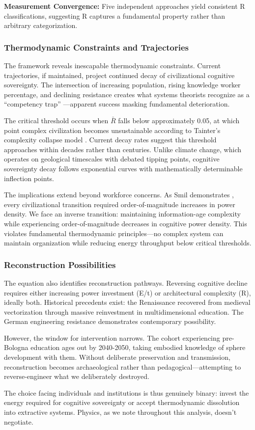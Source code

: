 \textbf{Measurement Convergence:} Five independent approaches yield consistent R classifications, suggesting R captures a fundamental property rather than arbitrary categorization.

\subsubsection{Thermodynamic Constraints and Trajectories}

The framework reveals inescapable thermodynamic constraints. Current trajectories, if maintained, project continued decay of civilizational cognitive sovereignty. The intersection of increasing population, rising knowledge worker percentage, and declining resistance creates what systems theorists recognize as a ``competency trap'' \citep{levitt1988}---apparent success masking fundamental deterioration.

The critical threshold occurs when $\bar{R}$ falls below approximately 0.05, at which point complex civilization becomes unsustainable according to Tainter's complexity collapse model \citep{tainter1988}. Current decay rates suggest this threshold approaches within decades rather than centuries. Unlike climate change, which operates on geological timescales with debated tipping points, cognitive sovereignty decay follows exponential curves with mathematically determinable inflection points.

The implications extend beyond workforce concerns. As Smil demonstrates \citep{smil2017}, every civilizational transition required order-of-magnitude increases in power density. We face an inverse transition: maintaining information-age complexity while experiencing order-of-magnitude decreases in cognitive power density. This violates fundamental thermodynamic principles---no complex system can maintain organization while reducing energy throughput below critical thresholds.

\subsubsection{Reconstruction Possibilities}

The equation also identifies reconstruction pathways. Reversing cognitive decline requires either increasing power investment (E/t) or architectural complexity (R), ideally both. Historical precedents exist: the Renaissance recovered from medieval vectorization through massive reinvestment in multidimensional education. The German engineering resistance demonstrates contemporary possibility.

However, the window for intervention narrows. The cohort experiencing pre-Bologna education ages out by 2040-2050, taking embodied knowledge of sphere development with them. Without deliberate preservation and transmission, reconstruction becomes archaeological rather than pedagogical---attempting to reverse-engineer what we deliberately destroyed.

The choice facing individuals and institutions is thus genuinely binary: invest the energy required for cognitive sovereignty or accept thermodynamic dissolution into extractive systems. Physics, as we note throughout this analysis, doesn't negotiate.